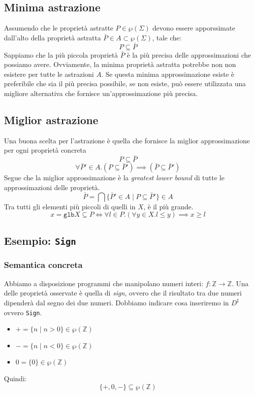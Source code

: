 \subsection{Minima astrazione}
Assumendo che le proprietà astratte $P \in \wp(\Sigma)$ devono essere apporssimate 
dall'alto della proprietà astratta $\bar{P} \in A \subset \wp(\Sigma)$, tale che:
\[
  P \subseteq \bar{P}
\]
Sappiamo che la più piccola proprietà $\bar{P}$ è la più precisa delle approssimazioni che possiamo avere.
Ovviamente, la minima proprietà astratta potrebbe non non esistere per tutte le astrazioni $A$.
Se questa minima approssimazione esiste è preferibile che sia il più precisa possibile, se non esiste,
può essere utilizzata una
migliore alternativa che fornisce un'approssimazione più precisa.
\subsection{Miglior astrazione}
Una buona scelta per l'astrazione è quella che fornisce la
miglior approssimazione per ogni proprietà concreta
\[
  P \subseteq \bar{P}
\]
\[
  \forall \bar{P}' \in A . (P \subseteq \bar{P}') \implies (\bar{P} \subseteq \bar{P}')
\]
Segue che la miglior approssimazione è la \textit{greatest lower bound} di tutte le approssimazioni
delle proprietà.
\[
\bar{P} = \bigcap \{\bar{P}' \in A \mid P \subseteq \bar{P}'\} \in A
\]
Tra tutti gli elementi più piccoli di quelli in $X$, è il più grande.
\[
  x = \texttt{glb}X \subseteq P \iff \forall l \in P . (\forall y \in X. l \leq y) \implies x \geq l
\]
\subsection{Esempio: \texttt{Sign}}
\subsubsection{Semantica concreta}
Abbiamo a disposizione programmi che manipolano numeri interi: \(f: \mathbb{Z} \to \mathbb{Z}\). Una delle 
proprietà osservate è quella di \textit{sign}, ovvero che il risultato tra due numeri dipenderà dal segno
dei due numeri. Dobbiamo indicare cosa inseriremo in $D^\sharp$ ovvero \texttt{Sign}.
\begin{itemize}
  \item $+ = \{n \mid n > 0\} \in \wp(\mathbb{Z})$
  \item $- = \{n \mid n < 0\} \in \wp(\mathbb{Z})$
  \item $0 = \{0\} \in \wp(\mathbb{Z})$
\end{itemize}
Quindi:
\[
  \{+, 0, -\} \subseteq \wp(\mathbb{Z})
\] 

